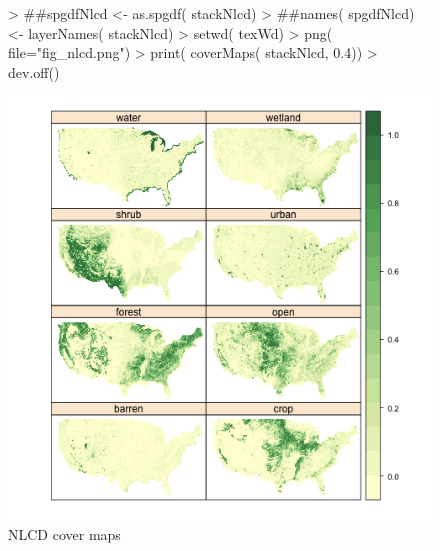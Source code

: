 \begin{figure} 
\begin{center} 

\begin{Schunk}
\begin{Sinput}
> ##spgdfNlcd <- as.spgdf( stackNlcd)
> ##names( spgdfNlcd) <- layerNames( stackNlcd)
> setwd( texWd)
> png( file="fig_nlcd.png")
> print( coverMaps( stackNlcd, 0.4))
> dev.off()
\end{Sinput}
\end{Schunk}

\includegraphics{fig_nlcd}
\end{center} 
\caption{NLCD cover maps} 
\label{fig:nlcd} 
\end{figure} 

